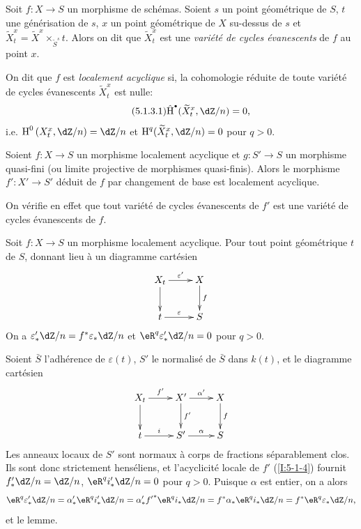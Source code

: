 \begin{definition}\label{I:5-1-3}
Soit $f:X\to S$ un morphisme de schémas. Soient $s$ un point géométrique de 
$S$, $t$ une générisation de $s$, $x$ un point géométrique de $X$ 
su-dessus de $s$ et 
$\widetilde X_t^x = \widetilde X^x\times_{\widetilde S^s} t$. Alors on dit que 
$\widetilde X_t^x$ est une \emph{variété de cycles évanescents} de $f$ au 
point $x$. 

On dit que $f$ est \emph{localement acyclique} si, la cohomologie réduite de 
toute variété de cycles évanescents $\widetilde X_t^x$ est nulle:
\begin{equation*}\tag{5.1.3.1}\label{I:eq:5-1-3-1}
  \hat\h^\bullet(\widetilde X_t^x,\dZ/n) = 0\text{,}
\end{equation*}
i.e. $\h^0\left(X_t^x,\dZ/n\right) = \dZ/n$ et 
$\h^q(\widetilde X_t^x,\dZ/n) = 0$ pour $q>0$. 
\end{definition}





\begin{lemma}\label{I:5-1-4}
Soient $f:X\to S$ un morphisme localement acyclique et $g:S'\to S$ un morphisme 
quasi-fini (ou limite projective de morphismes quasi-finis). Alors le 
morphisme $f':X'\to S'$ déduit de $f$ par changement de base est localement 
acyclique.
\end{lemma}

On vérifie en effet que tout variété de cycles évanescents de $f'$ est 
une variété de cycles évanescents de $f$.  	





\begin{lemma}\label{I:5-1-5}
Soit $f:X\to S$ un morphisme localement acyclique. Pour tout point géométrique 
$t$ de $S$, donnant lieu à un diagramme cartésien 
\[\xymatrix{
  X_t \ar[r]^-{\varepsilon'} \ar[d] 
    & X \ar[d]^-f \\
  t \ar[r]^-\varepsilon 
    & S
}\]
On a $\varepsilon_*' \dZ/n = f^*\varepsilon_* \dZ/n$ et $\eR^q \varepsilon_*'\dZ/n=0$ 
pour $q>0$. 
\end{lemma}

Soient $\bar S$ l'adhérence de $\varepsilon(t)$, $S'$ le normalisé de $\bar S$ 
dans $k(t)$, et le diagramme cartésien 
\[\xymatrix{
  X_t \ar[r]^-{f'} \ar[d] 
    & X' \ar[r]^-{\alpha'} \ar[d]^-{f'} 
    & X \ar[d]^-f \\
  t \ar[r]^-i 
    & S' \ar[r]^-\alpha 
    & S
}\]
Les anneaux locaux de $S'$ sont normaux à corps de fractions séparablement 
clos. Ils sont donc strictement henséliens, et l'acyclicité locale de $f'$ 
(\ref{I:5-1-4}) fournit $f_*'\dZ/n = \dZ/n$, $\eR^qi_*'\dZ/n = 0$ pour $q>0$. 
Puisque $\alpha$ est entier, on a alors 
\[
  \eR^q\varepsilon_*'\dZ/n 
    = \alpha_*' \eR^q i_*' \dZ/n 
    = \alpha_*' {f'}^* \eR^q i_* \dZ/n 
    = f^* \alpha_* \eR^q i_* \dZ/n 
    = f^* \eR^q \varepsilon_* \dZ/n \text{,}
\]
et le lemme. 





